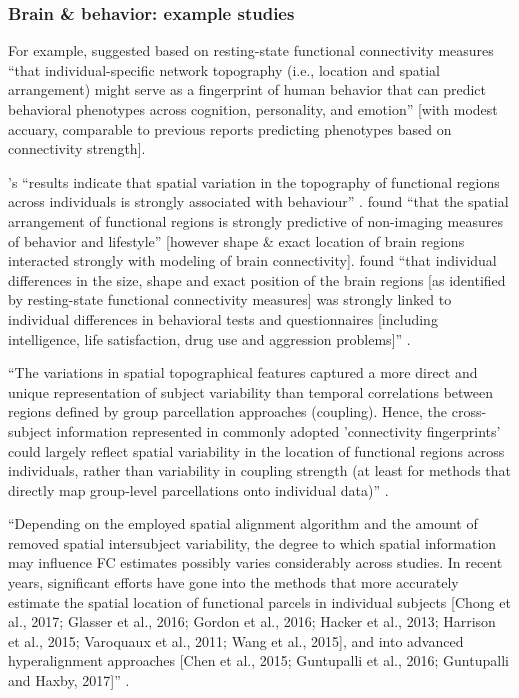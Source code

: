 \subsubsection{Brain \& behavior: example studies}

%
For example, \citet{kong2019spatial} suggested based on resting-state functional
connectivity measures ``that individual-specific network topography (i.e.,
location and spatial arrangement) might serve as a fingerprint of human behavior
that can predict behavioral phenotypes across cognition, personality, and
emotion'' \citep{kong2019spatial} [with modest accuary, comparable to previous
reports predicting phenotypes based on connectivity strength].

%
\citep{bijsterbosch2018relationship}'s ``results indicate that spatial variation
in the topography of functional regions across individuals is strongly
associated with behaviour'' \citep{bijsterbosch2018relationship}.
%
\citet{bijsterbosch2018relationship} found ``that the spatial arrangement of
functional regions is strongly predictive of non-imaging measures of behavior
and lifestyle'' [however shape \& exact location of brain regions interacted
strongly with  modeling of brain connectivity].
%
\citet{bijsterbosch2018relationship} found ``that individual differences in the
size, shape and exact position of the brain regions [as identified by
resting-state functional connectivity measures] was strongly linked to
individual differences in behavioral tests and questionnaires [including
intelligence, life satisfaction, drug use and aggression problems]''
\citep{bijsterbosch2018relationship}.

%
``The variations in spatial topographical features captured a more direct and
unique representation of subject variability than temporal correlations between
regions defined by group parcellation approaches (coupling).
%
Hence, the cross-subject information represented in commonly adopted
'connectivity fingerprints' could largely reflect spatial variability in the
location of functional regions across individuals, rather than variability in
coupling strength (at least for methods that directly map group-level
parcellations onto individual data)'' \citep{bijsterbosch2018relationship}.

%
``Depending on the employed spatial alignment algorithm and the amount of
removed spatial intersubject variability, the degree to which spatial
information may influence FC estimates possibly varies considerably across
studies.
%
In recent years, significant efforts have gone into the methods that more
accurately estimate the spatial location of functional parcels in individual
subjects [Chong et al., 2017; Glasser et al., 2016; Gordon et al., 2016; Hacker
et al., 2013; Harrison et al., 2015; Varoquaux et al., 2011; Wang et al., 2015],
and into advanced hyperalignment approaches [Chen et al., 2015; Guntupalli et
al., 2016; Guntupalli and Haxby, 2017]'' \citep{bijsterbosch2018relationship}.

